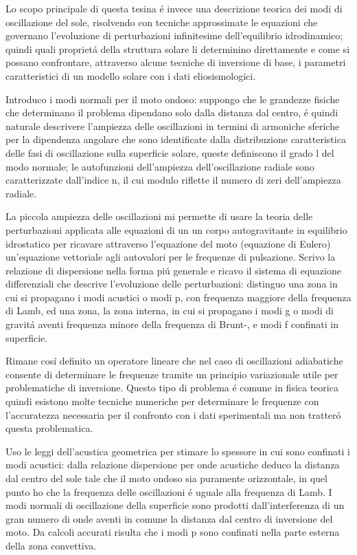 \documentclass[oneside,12pt,fleqn]{memoir}
\begin{document}
Lo scopo principale di questa tesina \'e invece una descrizione teorica dei modi di oscillazione del sole, risolvendo con tecniche approssimate le equazioni che governano l'evoluzione di perturbazioni infinitesime dell'equilibrio idrodinamico; quindi quali propriet\'a della struttura solare li determinino direttamente e come si possano confrontare, attraverso alcune tecniche di inversione di base, i parametri caratteristici di un modello solare con i dati eliosismologici.

Introduco i modi normali per il moto ondoso: suppongo che le grandezze fisiche che determinano il problema dipendano solo dalla distanza dal centro, \'e quindi naturale descrivere l'ampiezza delle oscillazioni  in termini di armoniche sferiche per la dipendenza angolare che sono identificate dalla distribuzione caratteristica delle fasi di oscillazione sulla superficie solare, queste definiscono il grado l del modo normale; le autofunzioni dell'ampiezza dell'oscillazione radiale sono caratterizzate dall'indice n, il cui modulo riflette il numero di zeri dell'ampiezza radiale.


La piccola ampiezza delle oscillazioni mi permette di usare la teoria delle perturbazioni applicata alle equazioni di un un corpo autogravitante in equilibrio idrostatico per ricavare attraverso l'equazione del moto (equazione di Eulero) un'equazione vettoriale agli autovalori per le frequenze di pulsazione. 
Scrivo la relazione di dispersione nella forma pi\'u generale e ricavo il sistema di equazione differenziali che descrive l'evoluzione delle perturbazioni: distinguo una zona in cui si propagano i modi acustici o modi p, con frequenza maggiore della frequenza di Lamb, ed una zona, la zona interna, in cui si propagano i modi g o modi di gravit\'a aventi frequenza minore della frequenza di Brunt-\vai{}, e modi f confinati in superficie. 

Rimane cos\'i definito un operatore lineare che nel caso di oscillazioni adiabatiche consente di determinare le frequenze tramite un principio variazionale utile per problematiche di inversione. Questo tipo di problema \'e comune in fisica teorica quindi esistono molte tecniche numeriche per determinare le frequenze con l'accuratezza necessaria per il confronto con i dati sperimentali ma non tratter\'o questa problematica.

Uso le leggi dell'acustica geometrica per stimare lo spessore in cui sono confinati i modi acustici: dalla relazione dispersione per onde acustiche deduco la distanza dal centro del sole tale che il moto ondoso sia puramente orizzontale, in quel punto ho che la frequenza delle oscillazioni \'e uguale alla frequenza di Lamb. I modi normali di oscillazione della superficie sono prodotti dall'interferenza di un gran numero di onde aventi in comune la distanza dal centro di inversione del moto. Da calcoli accurati risulta che i modi p sono confinati nella parte esterna della zona convettiva. 
\end{document}

